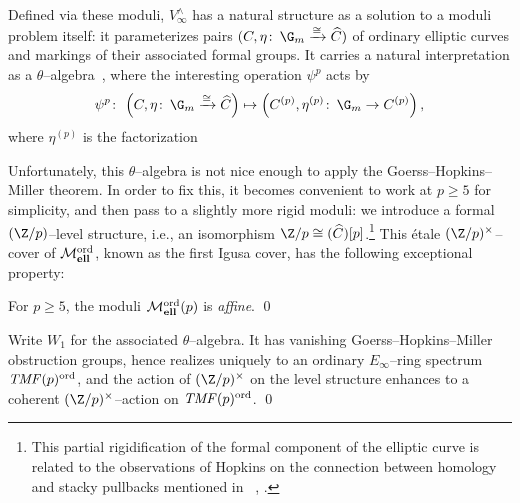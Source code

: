 \noindent Defined via these moduli, \(V^\wedge_\infty\) has a natural structure as a solution to a moduli problem itself: it parameterizes pairs \((C, \eta\co \G_m \xrightarrow{\cong} \widehat C)\) of ordinary elliptic curves and markings of their associated formal groups.  It carries a natural interpretation as a \(\theta\)--algebra~\cite[Equation 5.3]{BehrensConstruction}, where the interesting operation \(\psi^p\) acts by
\[
\psi^p\co \left(C, \eta\co \G_m \xrightarrow\cong \widehat C\right) \mapsto \left(C^{(p)}, \eta^{(p)}\co \G_m \to C^{(p)}\right),\]
where \(\eta^{(p)}\) is the factorization
\begin{center}
\end{center}
Unfortunately, this \(\theta\)--algebra is not nice enough to apply the Goerss--Hopkins--Miller theorem.  In order to fix this, it becomes convenient to work at \(p \ge 5\) for simplicity, and then pass to a slightly more rigid moduli: we introduce a formal \((\Z/p)\)--level structure, i.e., an isomorphism \(\Z/p \cong (\widehat C)[p]\).\footnote{This partial rigidification of the formal component of the elliptic curve is related to the observations of Hopkins on the connection between homology and stacky pullbacks mentioned in ~\cite[Section 3.1]{HopkinsFromSpectraToStacks}, \cite[Section 12]{Rezk512Notes}.}  This \'etale \((\Z/p)^\times\)--cover of \(\mathcal{M}_{\mathbf{ell}}^{\mathrm{ord}}\), known as the first Igusa cover, has the following exceptional property:

\begin{lemma}
For \(p \ge 5\), the moduli \(\mathcal{M}_{\mathbf{ell}}^{\mathrm{ord}}(p)\) is \emph{affine}. \qed
\end{lemma}

\begin{corollary}
Write \(W_1\) for the associated \(\theta\)--algebra.  It has vanishing Goerss--Hopkins--Miller obstruction groups, hence realizes uniquely to an ordinary \(E_\infty\)--ring spectrum \(\mathit{TMF}(p)^{\mathrm{ord}}\), and the action of \((\Z/p)^\times\) on the level structure enhances to a coherent \((\Z/p)^\times\)--action on \(\mathit{TMF}(p)^{\mathrm{ord}}\). \qed
\end{corollary}

